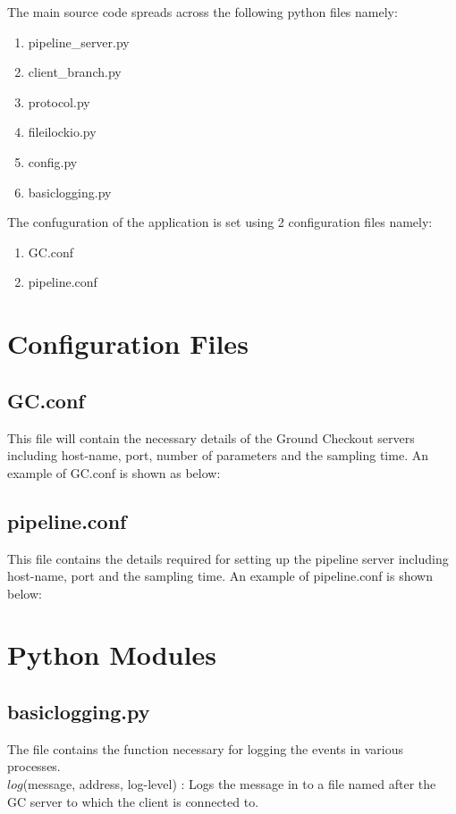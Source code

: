 The main source code spreads across the following python files namely:
\begin{enumerate}
	\item pipeline\_server.py
	\item client\_branch.py
	\item protocol.py
	\item fileilockio.py
	\item config.py
	\item basiclogging.py
\end{enumerate}
The confuguration of the application is set using 2 configuration files namely:
\begin{enumerate}
	\item GC.conf
	\item pipeline.conf
\end{enumerate}

\section{Configuration Files}

\subsection{GC.conf}
This file will contain the necessary details of the Ground Checkout servers
including host-name, port, number of parameters and the sampling time. An example
of GC.conf is shown as below:


\subsection{pipeline.conf}
This file contains the details required for setting up the pipeline server
including host-name, port and the sampling time. An example of pipeline.conf is
shown below:



\section{Python Modules}

\subsection{basiclogging.py}
The file contains the function necessary for logging the events in various
processes.\\
$log$(message, address, log-level) : Logs the message
in to a file named after the GC server to which the client is connected to.

